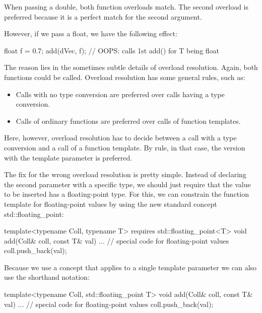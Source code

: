 When passing a double, both function overloads match. The second overload is preferred because it is a perfect match for the second argument.

However, if we pass a float, we have the following effect:

\begin{cpp}
float f = 0.7;
add(dVec, f); // OOPS: calls 1st add() for T being float
\end{cpp}

The reason lies in the sometimes subtle details of overload resolution. Again, both functions could be called. Overload resolution has some general rules, such as:

\begin{itemize}
\item
Calls with no type conversion are preferred over calls having a type conversion.

\item
Calls of ordinary functions are preferred over calls of function templates.
\end{itemize}

Here, however, overload resolution has to decide between a call with a type conversion and a call of a function template. By rule, in that case, the version with the template parameter is preferred.


The fix for the wrong overload resolution is pretty simple. Instead of declaring the second parameter with a specific type, we should just require that the value to be inserted has a floating-point type. For this, we can constrain the function template for floating-point values by using the new standard concept std::floating\_point:

\begin{cpp}
template<typename Coll, typename T>
requires std::floating_point<T>
void add(Coll& coll, const T& val)
{
	... // special code for floating-point values
	coll.push_back(val);
}
\end{cpp}

Because we use a concept that applies to a single template parameter we can also use the shorthand notation:

\begin{cpp}
template<typename Coll, std::floating_point T>
void add(Coll& coll, const T& val)
{
	... // special code for floating-point values
	coll.push_back(val);
}
\end{cpp}

